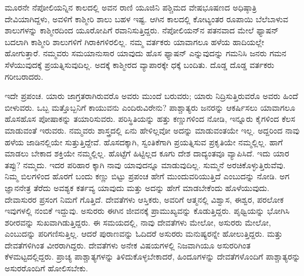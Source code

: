 ಮೂರನೇ ನೆಪೋಲಿಯನ್ನಿನ ಕಾಲದಲ್ಲಿ ಅವನ ರಾಣಿ ಯೂಜಿನಿ ಪಶ್ಚಿಮದ ವೇಷಭೂಷಣದ ಅಧಿಷ್ಠಾತ್ರಿ ದೇವಿಯಾಗಿದ್ದಳು, ಅವಳಿಗೆ ಕಾಶ್ಮೀರಿ ಶಾಲು ಬಹಳ ಇಷ್ಟ. ಆಗಿನ ಕಾಲದಲ್ಲಿ ಕೋಟ್ಯಂತರ ರೂಪಾಯಿ ಬೆಲೆಬಾಳುವ ಶಾಲುಗಳನ್ನು ಕಾಶ್ಮೀರದಿಂದ ಯೂರೋಪಿಗೆ ರವಾನಿಸುತ್ತಿದ್ದರು. ನೆಪೋಲಿಯನ್​ನ ಪತನ\break ವಾದ ಮೇಲೆ ಫ್ಯಾಷನ್​ ಬದಲಾಗಿ ಕಾಶ್ಮೀರಿ ಶಾಲುಗಳಿಗೆ ಗಿರಾಕಿಗಳಿರಲಿಲ್ಲ. ನಮ್ಮ ವರ್ತಕರು ಯಾವಾಗಲೂ ಹಳೆಯ ಹಾದಿಯಲ್ಲೇ ಹೋಗುತ್ತಾರೆ. ನಮ್ಮವರು ಸಮಯಾನುಸಾರ ಯಾವುದು ಹೊಸ ಫ್ಯಾಷನ್​ ಎನ್ನುವುದನ್ನು ಗಮನಿಸಿ ಜನರು ಗಮನ ಸೆಳೆಯುವುದಕ್ಕೆ ಪ್ರಯತ್ನಿಸುವುದಿಲ್ಲ. ಅದಕ್ಕೆ ಕಾಶ್ಮೀರದ ವ್ಯಾಪಾರಕ್ಕೇ ಧಕ್ಕೆ ಬಂದಿತು. ದೊಡ್ಡ ದೊಡ್ಡ ವರ್ತಕರು ಗರೀಬರಾದರು.

ಇದೇ ಪ್ರಪಂಚ. ಯಾರು ಜಾಗ್ರತರಾಗಿರುವರೊ ಅವರು ಮುಂದೆ ಬರುವರು; ಯಾರು ನಿದ್ರಿಸುತ್ತಿರುವರೊ ಅವರು ಹಿಂದೆ ಬೀಳುವರು. ಒಬ್ಬ ಮತ್ತೊಬ್ಬನಿಗೆ ಕಾಯುವನು ಎಂದಿರುವಿರೇನು? ಪಾಶ್ಚಾತ್ಯರು ಜನರನ್ನು ಆಕರ್ಷಿಸಲು ಯಾವಾಗಲೂ ಹೊಸಹೊಸ ಪೋಷಾಕನ್ನು ತಯಾರಿಸುವರು. ಪರಿಸ್ಥಿತಿಯನ್ನು ಹತ್ತು ಕಣ್ಣುಗಳಿಂದ ನೋಡಿ, ಇನ್ನೂರು ಕೈಗಳಿಂದ ಕೆಲಸ ಮಾಡುವಂತೆ ಇರುವರು. ನಮ್ಮವರು ಶಾಸ್ತ್ರದಲ್ಲಿ ಏನು ಹೇಳಿಲ್ಲವೋ ಅದನ್ನು ಮಾಡುವಂತಯೇ ಇಲ್ಲ. ಅದ್ದರಿಂದ ನಾವು ಹಳೆಯ ಜಾಡಿನಲ್ಲಿಯೇ ಸುತ್ತುತ್ತಿದ್ದೇವೆ. ಹೊಸದಕ್ಕಾಗಿ, ಸ್ವಂತಿಕೆಗಾಗಿ ಪ್ರಯತ್ನಿಸುವ ಪ್ರಕೃತಿಯೇ ನಮ್ಮಲ್ಲಿಲ್ಲ. ಹಾಗೆ ಮಾಡಲು ಬೇಕಾದ ಶಕ್ತಿಯೇ ನಮ್ಮಲ್ಲಿಲ್ಲ. ಹೊಟ್ಟೆಗೆ ಹಿಟ್ಟಿಲ್ಲದ ಕೂಗು ದೇಶ ದಾದ್ಯಂತವೂ ವ್ಯಾಪಿಸಿದೆ. ಇದು ಯಾರ ತಪ್ಪು? ನಮ್ಮದು. ಇದರ ಪರಿಹಾರ ಕ್ಕಾಗಿ ನಾವು ಯಾವುದನ್ನೂ ಮಾಡುವುದಿಲ್ಲ. ಸುಮ್ಮನೆ ಅರಚಿಕೊಳ್ಳುತ್ತಿರುವೆವು. ನಿಮ್ಮ ಬಿಲಗಳಿಂದ ಹೊರಗೆ ಬಂದು ಕಣ್ಣು ಬಿಟ್ಟು ಪ್ರಪಂಚ ಹೇಗೆ ಮುಂದುವರಿಯುತ್ತಿದೆ ಎಂಬುದನ್ನು ನೋಡಿ. ಅಗ ಜ್ಞಾನನೇತ್ರ ತೆರೆದು ಅವಶ್ಯಕ ಕರ್ತವ್ಯ ಯಾವುದು ಮತ್ತು ಅದನ್ನು ಹೇಗೆ ಮಾಡಬೇಕೆಂದು ಹೊಳೆಯುವುದು. ದೇವಾಸುರರ ಪ್ರಸಂಗ ನಿಮಗೆ ಗೊತ್ತಿದೆ. ದೇವತೆಗಳು ಆಸ್ತಿಕರು, ಅವರಿಗೆ ಆತ್ಮನಲ್ಲಿ ವಿಶ್ವಾಸ, ಈಶ್ವರ, ಪರಲೋಕ ಇವುಗಳಲ್ಲಿ ನಂಬಿಕೆ ಇದ್ದುವು. ಅಸುರರು ಈಗಿನ ಜೀವನಕ್ಕೆ ಪ್ರಾಮುಖ್ಯವನ್ನು ಕೊಡುತ್ತಿದ್ದರು. ಪೃಥ್ವಿಯನ್ನು ಭೋಗಿಸಿ ಶರೀರವನ್ನು ಸುಖವಾಗಿಡುತ್ತಿದ್ದರು. ಈ ಸಮಯದಲ್ಲಿ, ನಾವು ದೇವತೆಗಳು ಮೇಲೋ, ಅಸುರರು ಮೇಲೋ, ಎಂಬುದನ್ನು ಪರಿಗಣಿಸುತ್ತಿಲ್ಲ. ಆದರೆ ಪುರಾಣವನ್ನು ಓದಿದರೆ ಅಸುರರು ಮನುಷ್ಯರನ್ನೇ ಹೋಲುತ್ತಿದ್ದರು. ಮತ್ತು ದೇವತೆಗಳಿಗಿಂತ ವೀರರಾಗಿದ್ದರು. ದೇವತೆಗಳು ಅನೇಕ ವಿಷಯಗಳಲ್ಲಿ ನಿಜವಾಗಿಯೂ ಅಸುರರಿಗಿಂತ ಕೆಳಮಟ್ಟದಲ್ಲಿದ್ದರು. ಪ್ರಾಚ್ಯ ಪಾಶ್ಚಾತ್ಯಗಳನ್ನು ತಿಳಿದುಕೊಳ್ಳಬೇಕಾದರೆ, ಹಿಂದೂಗಳನ್ನು ದೇವತೆಗಳೊಂದಿಗೆ ಪಾಶ್ಚಾತ್ಯರನ್ನು ಅಸುರರೊಂದಿಗೆ ಹೋಲಿಸಬೇಕು.

